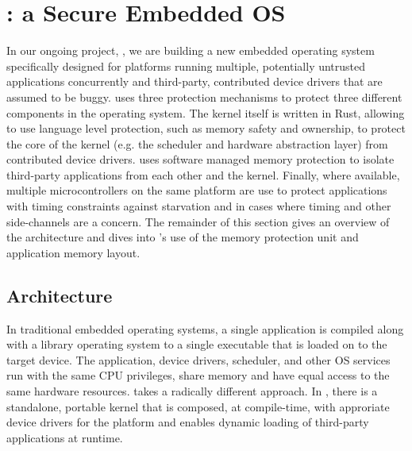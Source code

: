 \section{\name: a Secure Embedded OS}

In our ongoing project, \name, we are building a new embedded operating system
specifically designed for platforms running multiple, potentially untrusted
applications concurrently and third-party, contributed device drivers that are
assumed to be buggy. \name uses three protection mechanisms to protect three
different components in the operating system. The kernel itself is written in
Rust, allowing \name to use language level protection, such as memory safety and
ownership, to protect the core of the kernel (e.g. the scheduler and hardware
abstraction layer) from contributed device drivers. \name uses software managed
memory protection to isolate third-party applications from each other and the
kernel. Finally, where available, multiple microcontrollers on the same platform
are use to protect applications with timing constraints against starvation and
in cases where timing and other side-channels are a concern. The remainder of
this section gives an overview of the \name architecture and dives into \name's
use of the memory protection unit and application memory layout.

\subsection{Architecture}

In traditional embedded operating systems, a single application is
compiled along with a library operating system to a single executable that is
loaded on to the target device. The application, device drivers, scheduler, and
other OS services run with the same CPU privileges, share memory and have equal access
to the same hardware resources. \name takes a radically different approach. In
\name, there is a standalone, portable kernel that is composed, at compile-time,
with approriate device drivers for the platform and enables dynamic loading of
third-party applications at runtime.

